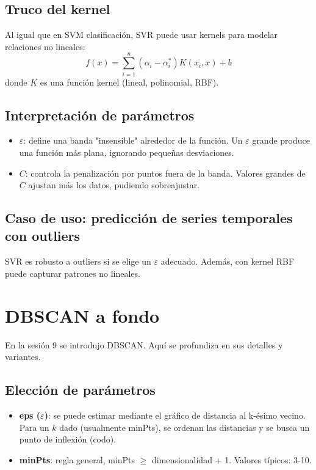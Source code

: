 \documentclass[12pt,a4paper,openany,oneside]{book}
\begin{document}
\subsection{Truco del kernel}
Al igual que en SVM clasificación, SVR puede usar kernels para modelar relaciones no lineales:
\[
f(x) = \sum_{i=1}^n (\alpha_i - \alpha_i^*) K(x_i, x) + b
\]
donde \(K\) es una función kernel (lineal, polinomial, RBF).

\subsection{Interpretación de parámetros}
\begin{itemize}
    \item \(\varepsilon\): define una banda "insensible" alrededor de la función. Un \(\varepsilon\) grande produce una función más plana, ignorando pequeñas desviaciones.
    \item \(C\): controla la penalización por puntos fuera de la banda. Valores grandes de \(C\) ajustan más los datos, pudiendo sobreajustar.
\end{itemize}

\subsection{Caso de uso: predicción de series temporales con outliers}
SVR es robusto a outliers si se elige un \(\varepsilon\) adecuado. Además, con kernel RBF puede capturar patrones no lineales.

\section{DBSCAN a fondo}

En la sesión 9 se introdujo DBSCAN. Aquí se profundiza en sus detalles y variantes.

\subsection{Elección de parámetros}
\begin{itemize}
    \item \textbf{eps (\(\varepsilon\))}: se puede estimar mediante el gráfico de distancia al k-ésimo vecino. Para un \(k\) dado (usualmente minPts), se ordenan las distancias y se busca un punto de inflexión (codo).
    \item \textbf{minPts}: regla general, minPts \(\ge\) dimensionalidad + 1. Valores típicos: 3-10.
\end{itemize}
\end{document}
